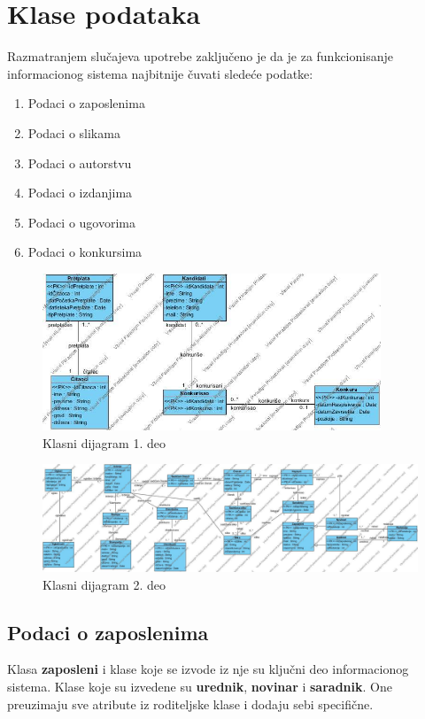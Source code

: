 \chapter{Klase podataka}

Razmatranjem slučajeva upotrebe zaključeno je da je za funkcionisanje informacionog sistema najbitnije čuvati sledeće podatke:
\begin{enumerate}
\item Podaci o zaposlenima
\item Podaci o slikama
\item Podaci o autorstvu
\item Podaci o izdanjima
\item Podaci o ugovorima
\item Podaci o konkursima
\end{enumerate}

\begin{figure}[htp]
    \centering
    \includegraphics[width=0.9\textwidth]{slike/konkurs-pretplata}
    \caption{Klasni dijagram 1. deo}
    \label{klase1}
\end{figure}    

\begin{figure}[htp]
    \centering
    \includegraphics[width=0.9\textheight, angle=90]{slike/klasni_dijagram}
    \caption{Klasni dijagram 2. deo}
    \label{klase2}
\end{figure}    



\newpage

\section{Podaci o zaposlenima}
Klasa \textbf{zaposleni} i klase koje se izvode iz nje su ključni deo informacionog sistema. Klase koje su izvedene su \textbf{urednik}, \textbf{novinar} i \textbf{saradnik}. One preuzimaju sve atribute iz roditeljske klase i dodaju sebi specifične. \\

